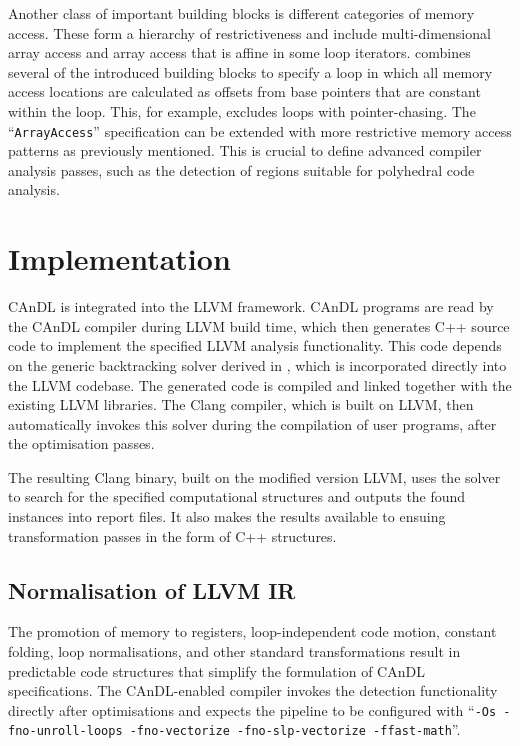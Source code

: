     Another class of important building blocks is different categories of
    memory access.
    These form a hierarchy of restrictiveness and include multi-dimensional
    array access and array access that is affine in some loop iterators.
     combines several of the introduced building blocks to
    specify a loop in which all memory access locations are calculated as
    offsets from base pointers that are constant within the loop.
    This, for example, excludes loops with pointer-chasing.
    The ``{\tt ArrayAccess}'' specification can be extended with more restrictive
    memory access patterns as previously mentioned.
    This is crucial to define advanced compiler analysis passes, such as the
    detection of regions suitable for polyhedral code analysis.

\section{Implementation}

    CAnDL is integrated into the LLVM framework.
    CAnDL programs are read by the CAnDL compiler during LLVM build time, which
    then generates C++ source code to implement the specified LLVM analysis
    functionality.
    This code depends on the generic backtracking solver derived in
    , which is incorporated directly into the LLVM
    codebase.
    The generated code is compiled and linked together with the existing LLVM
    libraries.
    The Clang compiler, which is built on LLVM, then automatically invokes this
    solver during the compilation of user programs, after the optimisation
    passes.

    The resulting Clang binary, built on the modified version LLVM, uses the
    solver to search for the specified computational structures and outputs the
    found instances into report files.
    It also makes the results available to ensuing transformation passes in the
    form of C++ structures.

\subsection{Normalisation of LLVM IR}

    The promotion of memory to registers, loop-independent code motion,
    constant folding, loop normalisations, and other standard transformations
    result in predictable code structures that simplify the formulation of CAnDL
    specifications.
    The CAnDL-enabled compiler invokes the detection functionality
    directly after optimisations and expects the pipeline to be configured
    with
    ``{\tt -Os -fno-unroll-loops -fno-vectorize -fno-slp-vectorize -ffast-math}''.

